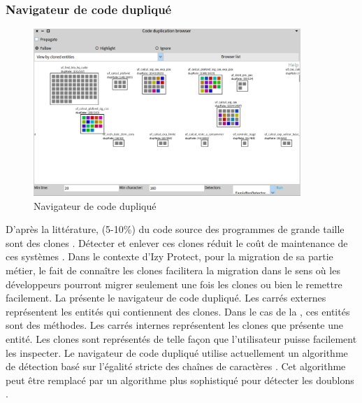 \documentclass[a4paper]{article}
\begin{document}
\subsubsection{Navigateur de code dupliqué}
\begin{figure}[htbp]
  \begin{center}
  \includegraphics[width=0.9\textwidth]{./figures/duplicationBrowser.png}
  \caption{Navigateur de code dupliqué}
  \label{fig:duplicationBrowser}
\end{center}
\vspace{-0.3cm}
\end{figure}
D'après la littérature, (5-10\%) du code source des programmes de grande taille sont des clones \cite{Baxt98a}.
Détecter et enlever ces clones réduit le coût de maintenance de ces systèmes \cite{Baxt98a}.
Dans le contexte d'Izy Protect, pour la migration de sa partie métier, le fait de connaître les clones facilitera la migration dans le sens où les développeurs pourront migrer seulement une fois les clones ou bien le remettre facilement.
La  présente le navigateur de code dupliqué.
Les carrés externes représentent les entités qui contiennent des clones.
Dans le cas de la , ces entités sont des  méthodes. 
Les carrés internes représentent les clones que présente une entité.
Les clones sont représentés de telle façon que l'utilisateur puisse facilement les inspecter.
Le navigateur de code dupliqué utilise actuellement un algorithme de détection basé sur l'égalité stricte des chaînes de caractères \citep{Duca99b}. 
Cet algorithme peut être remplacé par un algorithme plus sophistiqué pour détecter les doublons \citep{Roy07a}. 
\end{document}
